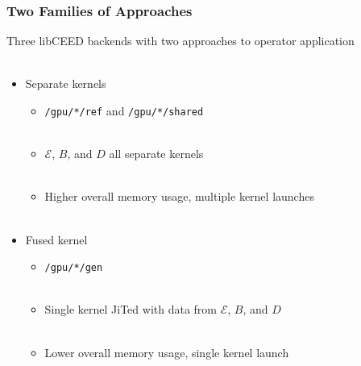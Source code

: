 \documentclass{beamer}
\begin{document}
\begin{frame}[fragile]
\begin{center}
\frametitle{Two Families of Approaches}

Three libCEED backends with two approaches to operator application\\

~\\

\begin{itemize}

\item Separate kernels

\begin{itemize}

\item \lstinline{/gpu/*/ref} and \lstinline{/gpu/*/shared}\\

~\\

\item $\mathcal{E}$, {\color{blue(ncs)}$B$}, and {\color{applegreen}$D$} all separate kernels\\

~\\

\item Higher overall memory usage, multiple kernel launches\\

~\\

\end{itemize}

\item Fused kernel

\begin{itemize}

\item \lstinline{/gpu/*/gen}\\

~\\

\item Single kernel JiTed with data from $\mathcal{E}$, {\color{blue(ncs)}$B$}, and {\color{applegreen}$D$}\\

~\\

\item Lower overall memory usage, single kernel launch\\

\end{itemize}

\end{itemize}

\end{center}
\end{frame}
\end{document}

